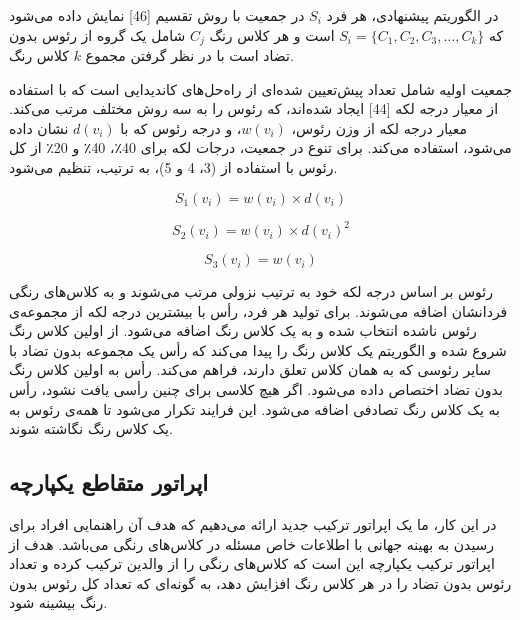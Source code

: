 \documentclass[a4paper,10pt]{article}
\begin{document}
            در الگوریتم پیشنهادی، هر فرد $S_i$ در جمعیت با روش تقسیم [46] نمایش داده می‌شود که
            $S_i = \{C_1, C_2, C_3, \dots, C_k\}$
            است و هر کلاس رنگ $C_j$ شامل یک گروه از رئوس بدون تضاد است با در نظر گرفتن مجموع $k$ کلاس رنگ.

            جمعیت اولیه شامل تعداد پیش‌تعیین شده‌ای از راه‌حل‌های کاندیدایی است که با استفاده از معیار درجه لکه [44] ایجاد شده‌اند، که رئوس را به سه روش مختلف مرتب می‌کند. معیار درجه لکه از وزن رئوس، $w(v_i)$، و درجه رئوس که با $d(v_i)$ نشان داده می‌شود، استفاده می‌کند. برای تنوع در جمعیت، درجات لکه برای 40٪، 40٪ و 20٪ از کل رئوس با استفاده از (3، 4 و 5)، به ترتیب، تنظیم می‌شود.

            \vspace{-0.5cm}

            \begin{equation}
                S_1 (v_i) = w(v_i) \times d(v_i)
            \end{equation}

            \vspace{-1cm}

            \begin{equation}
                S_2 (v_i) = w(v_i) \times d(v_i)^2
            \end{equation}

            \vspace{-1cm}

            \begin{equation}
                S_3 (v_i) = w(v_i)
            \end{equation}

            رئوس بر اساس درجه لکه خود به ترتیب نزولی مرتب می‌شوند و به کلاس‌های رنگی فردانشان اضافه می‌شوند. برای تولید هر فرد، رأس با بیشترین درجه لکه از مجموعه‌ی رئوس ناشده انتخاب شده و به یک کلاس رنگ اضافه می‌شود. از اولین کلاس رنگ شروع شده و الگوریتم یک کلاس رنگ را پیدا می‌کند که رأس یک مجموعه بدون تضاد با سایر رئوسی که به همان کلاس تعلق دارند، فراهم می‌کند. رأس به اولین کلاس رنگ بدون تضاد اختصاص داده می‌شود. اگر هیچ کلاسی برای چنین رأسی یافت نشود، رأس به یک کلاس رنگ تصادفی اضافه می‌شود. این فرایند تکرار می‌شود تا همه‌ی رئوس به یک کلاس رنگ نگاشته شوند.

        \subsection{اپراتور متقاطع یکپارچه}

            در این کار، ما یک اپراتور ترکیب جدید ارائه می‌دهیم که هدف آن راهنمایی افراد برای رسیدن به بهینه جهانی با اطلاعات خاص مسئله در کلاس‌های رنگی می‌باشد. هدف از اپراتور ترکیب یکپارچه این است که کلاس‌های رنگی را از والدین ترکیب کرده و تعداد رئوس بدون تضاد را در هر کلاس رنگ افزایش دهد، به گونه‌ای که تعداد کل رئوس بدون رنگ بیشینه شود.
\end{document}
